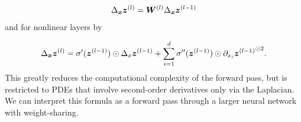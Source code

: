 \begin{align}\label{eq:forward_Laplacian_linear}
    \Delta_{\bm{x}}{\bm{z}}^{(l)} = {\bm{W}}^{(l)}\Delta_{\bm{x}}{\bm{z}}^{(l-1)}
\end{align}
and for nonlinear layers by
\begin{comment}
    \begin{align}
    \mZ^{(l)}
    =
     \begin{pmatrix}
         \sigma(\vz^{(l-1)}) \\
         \sigma'(\vz^{(l-1)})\odot \partial_{x_1}\vz^{(l-1)} \\
         \vdots \\
         \sigma'(\vz^{(l-1)})\odot \partial_{x_d}\vz^{(l-1)} \\
         \sigma'(\vz^{(l-1)})\odot\Delta_x\vz^{(l-1)} + \sum_{i=1}^d \sigma''(\vz^{(l-1)})\odot \partial_{x_i}{\vz^{(l-1)}}^{\odot 2}
     \end{pmatrix}
     \label{eq:forward-laplacian-nonlinear-layer-compact}
\end{align}
\end{comment}
\begin{align}\label{eq:forward_Laplacian_nonlinear}
    \Delta_{\bm{x}}{\bm{z}}^{(l)} = \sigma'({\bm{z}}^{(l-1)})\odot\Delta_x{\bm{z}}^{(l-1)} + \sum_{i=1}^d \sigma''({\bm{z}}^{(l-1)})\odot \partial_{x_i}{{\bm{z}}^{(l-1)}}^{\odot 2}.
\end{align}
This greatly reduces the computational complexity of the forward pass, but is restricted to PDEs that involve second-order derivatives only via the Laplacian. %
We can interpret this formula as a forward pass through a larger neural network with weight-sharing.
\begin{comment}
    by introducing the vector $\mZ^{(l)}\coloneqq  \begin{pmatrix}
    \vz^{(l)}
    &
    \partial_{\vx_1} \vz^{(l)}
    &
    \dots
    &
    \partial_{\vx_d} \vz^{(l)}
    &
    \Delta_\vx\vz^{(l)}
\end{pmatrix}\in \mathbb R^{(d+2)h^{(l)}}$.
     with
$\mZ^{(0)}=  \begin{pmatrix}
    \vx
    &
    \ve_1
    &
    \dots
    &
    \ve_d
    &
    0
\end{pmatrix}\in \mathbb R^{(d+2)d}$.
Rearranging $\mZ^{(l)}$ as a matrix of shape $(d+2)\times h^{(l)}$ and yields $\mZ^{(l)} = \mZ^{(l-1)}{\mW^{(l)}}^\top$ for linear layers.
\end{comment}

